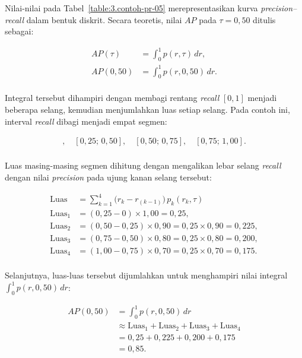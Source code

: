 Nilai-nilai pada Tabel~\ref{table:3.contoh-pr-05} merepresentasikan kurva \textit{precision--recall} dalam bentuk diskrit. Secara teoretis, nilai $AP$ pada $\tau = 0{,}50$ ditulis sebagai:

\medskip
\begin{align*}
    AP(\tau) &= \int_0^1 p(r,\tau)\,dr, \\[0.5em]
    AP(0{,}50) &= \int_0^1 p(r, 0{,}50)\, dr. \\[0.5em]
\end{align*}

Integral tersebut dihampiri dengan membagi rentang \textit{recall} $[0,1]$ menjadi beberapa selang, kemudian menjumlahkan luas setiap selang. Pada contoh ini, interval \textit{recall} dibagi menjadi empat segmen:

\medskip
\begin{align*}
[0;\,0{,}25],\quad
[0{,}25;\,0{,}50],\quad
[0{,}50;\,0{,}75],\quad
[0{,}75;\,1{,}00]. \\[0.5em]
\end{align*}

Luas masing-masing segmen dihitung dengan mengalikan lebar selang \textit{recall} dengan nilai \textit{precision} pada ujung kanan selang tersebut:

\medskip
\begin{align*}
    \text{Luas} &= \sum_{k=1}^{4} \big(r_k - r_{(k-1)}\big)\, p_k(r_k, \tau) \\[0.5em]
    \text{Luas}_1 &= (0{,}25 - 0)\times 1{,}00 = 0{,}25, \\[0.5em]
    \text{Luas}_2 &= (0{,}50 - 0{,}25)\times 0{,}90 = 0{,}25 \times 0{,}90 = 0{,}225, \\[0.5em]
    \text{Luas}_3 &= (0{,}75 - 0{,}50)\times 0{,}80 = 0{,}25 \times 0{,}80 = 0{,}200, \\[0.5em]
    \text{Luas}_4 &= (1{,}00 - 0{,}75)\times 0{,}70 = 0{,}25 \times 0{,}70 = 0{,}175. \\[0.5em]
\end{align*}

Selanjutnya, luas-luas tersebut dijumlahkan untuk menghampiri nilai integral $\int_0^1 p(r, 0{,}50)\,dr$:

\medskip
\begin{align*}
    AP(0{,}50) 
    &= \int_0^1 p(r, 0{,}50)\, dr \\
    &\approx \text{Luas}_1 + \text{Luas}_2 + \text{Luas}_3 + \text{Luas}_4 \\[0.5em]
    &= 0{,}25 + 0{,}225 + 0{,}200 + 0{,}175 \\[0.5em]
    &= 0{,}85. \\[0.5em]
\end{align*}


